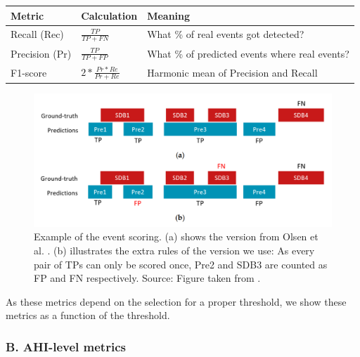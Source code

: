 \renewcommand{\arraystretch}{1.5}
\begin{table}[h!]
    \centering
    \begin{tabular}{p{1.6cm} p{2cm} p{4.4cm}}
        Metric & Calculation & Meaning \\
        \hline
        Recall \newline (Rec) & $\frac{TP}{TP+FN}$ & What \% of real events \newline got detected? \\
        Precision \newline (Pr) & $\frac{TP}{TP+FP}$ & What \% of predicted events \newline where real events? \\
        F1-score & $2 * \frac{Pr * Re}{Pr + Re}$ & Harmonic mean of \newline Precision and Recall \\
    \end{tabular}
\end{table}

\begin{figure}
    \centering
    \includegraphics[width=\textwidth]{images/EventScoring}
    \caption{Example of the event scoring. (a) shows the version from Olsen et al. \cite{olsen2020robust}. (b) illustrates the extra rules of the version we use: As every pair of TPs can only be scored once, Pre2 and SDB3 are counted as FP and FN respectively. Source: Figure taken from \cite{xie2023use}.}
    \label{fig:eventscoring}
\end{figure}

 As these metrics depend on the selection for a proper threshold, we  show these metrics as a function of the threshold.

\subsubsection*{B. AHI-level metrics}

